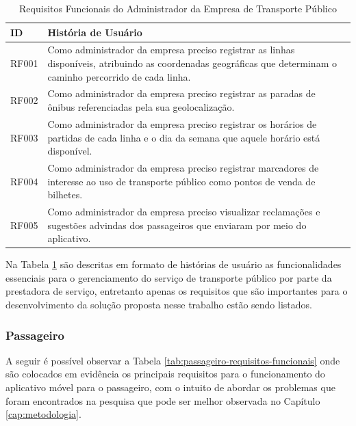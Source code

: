{\renewcommand{\arraystretch}{2}
\begin{table}[H]
\centering
\caption{Requisitos Funcionais do Administrador da Empresa de Transporte Público}
\label{tab:empresa-requisitos-funcionais}
\begin{tabular}{ l | p{13.5cm} }
\hline
\textbf{ID} & \textbf{História de Usuário} \\
\hline
RF001 & Como administrador da empresa preciso registrar as linhas disponíveis, atribuindo as coordenadas geográficas que determinam o caminho percorrido de cada linha.\\ \hline
RF002 & Como administrador da empresa preciso registrar as paradas de ônibus referenciadas pela sua geolocalização. \\ \hline
RF003 & Como administrador da empresa preciso registrar os horários de partidas de cada linha e o dia da semana que aquele horário está disponível. \\ \hline
RF004 & Como administrador da empresa preciso registrar marcadores de interesse ao uso de transporte público como pontos de venda de bilhetes. \\ \hline
RF005 & Como administrador da empresa preciso visualizar reclamações e sugestões advindas dos passageiros que enviaram por meio do aplicativo. \\ \hline
\end{tabular}
\end{table}

Na Tabela \ref{tab:empresa-requisitos-funcionais} são descritas em formato de histórias de usuário as funcionalidades essenciais para o gerenciamento do serviço de transporte público por parte da prestadora de serviço, entretanto apenas os requisitos que são importantes para o desenvolvimento da solução proposta nesse trabalho estão sendo listados.

\subsubsection*{Passageiro}

A seguir é possível observar a Tabela \ref{tab:passageiro-requisitos-funcionais} onde são colocados em evidência os principais requisitos para o funcionamento do aplicativo móvel para o passageiro, com o intuito de abordar os problemas que foram encontrados na pesquisa que pode ser melhor observada no Capítulo \ref{cap:metodologia}.

}
